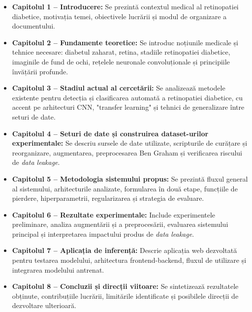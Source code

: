\documentclass[12pt, a4paper, twoside, romanian]{teza-upb}
\begin{document}
\begin{itemize}
  \item \textbf{Capitolul 1 -- Introducere:} Se prezintă contextul medical al retinopatiei diabetice, motivația temei,
    obiectivele lucrării și modul de organizare a documentului.

  \item \textbf{Capitolul 2 -- Fundamente teoretice:} Se introduc noțiunile medicale și tehnice necesare: diabetul
    zaharat, retina, stadiile retinopatiei diabetice, imaginile de fund de ochi, rețelele neuronale
    convoluționale și principiile învățării profunde.

  \item \textbf{Capitolul 3 -- Stadiul actual al cercetării:} Se analizează metodele existente pentru detecția
    și clasificarea automată a retinopatiei diabetice, cu accent pe arhitecturi CNN, "transfer
    learning" și tehnici de generalizare între seturi de date.

  \item \textbf{Capitolul 4 -- Seturi de date și construirea dataset-urilor experimentale:} Se descriu sursele
    de date utilizate, scripturile de curățare și reorganizare, augmentarea, preprocesarea Ben Graham și
    verificarea riscului de \textit{data leakage}.

  \item \textbf{Capitolul 5 -- Metodologia sistemului propus:} Se prezintă fluxul general al sistemului,
    arhitecturile analizate, formularea în două etape, funcțiile de pierdere, hiperparametrii,
    regularizarea și strategia de evaluare.

  \item \textbf{Capitolul 6 -- Rezultate experimentale:} Include experimentele preliminare, analiza augmentării
    și a preprocesării, evaluarea sistemului principal și interpretarea impactului produs de
    \textit{data leakage}.

  \item \textbf{Capitolul 7 -- Aplicația de inferență:} Descrie aplicația web dezvoltată pentru testarea
    modelului, arhitectura frontend-backend, fluxul de utilizare și integrarea modelului antrenat.

  \item \textbf{Capitolul 8 -- Concluzii și direcții viitoare:} Se sintetizează rezultatele obținute, contribuțiile lucrării,
    limitările identificate și posibilele direcții de dezvoltare ulterioară.
\end{itemize}
\end{document}
